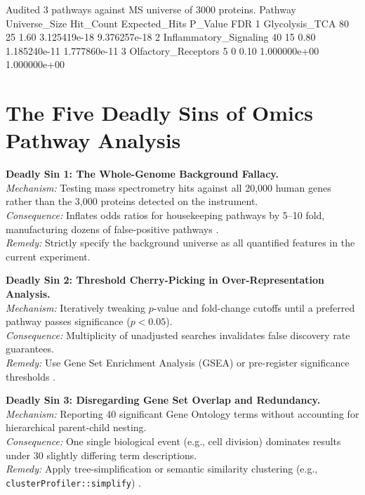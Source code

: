 \documentclass[11pt,oneside]{book}
\begin{document}
\begin{routput}
Audited 3 pathways against MS universe of 3000 proteins.
                 Pathway Universe\_Size Hit\_Count Expected\_Hits      P\_Value          FDR
1         Glycolysis\_TCA            80        25          1.60 3.125419e-18 9.376257e-18
2 Inflammatory\_Signaling            40        15          0.80 1.185240e-11 1.777860e-11
3    Olfactory\_Receptors             5         0          0.10 1.000000e+00 1.000000e+00
\end{routput}

\section{The Five Deadly Sins of Omics Pathway Analysis}

\begin{pitfallbox}
\textbf{Deadly Sin 1: The Whole-Genome Background Fallacy.}\\
\textit{Mechanism:} Testing mass spectrometry hits against all 20,000 human genes rather than the 3,000 proteins detected on the instrument.\\
\textit{Consequence:} Inflates odds ratios for housekeeping pathways by 5--10 fold, manufacturing dozens of false-positive pathways \cite{young2010gene, yu2012clusterprofiler}.\\
\textit{Remedy:} Strictly specify the background universe as all quantified features in the current experiment.
\end{pitfallbox}

\begin{pitfallbox}
\textbf{Deadly Sin 2: Threshold Cherry-Picking in Over-Representation Analysis.}\\
\textit{Mechanism:} Iteratively tweaking $p$-value and fold-change cutoffs until a preferred pathway passes significance ($p < 0.05$).\\
\textit{Consequence:} Multiplicity of unadjusted searches invalidates false discovery rate guarantees.\\
\textit{Remedy:} Use Gene Set Enrichment Analysis (GSEA) or pre-register significance thresholds \cite{subramanian2005gene, khatri2012ten}.
\end{pitfallbox}

\begin{pitfallbox}
\textbf{Deadly Sin 3: Disregarding Gene Set Overlap and Redundancy.}\\
\textit{Mechanism:} Reporting 40 significant Gene Ontology terms without accounting for hierarchical parent-child nesting.\\
\textit{Consequence:} One single biological event (e.g., cell division) dominates results under 30 slightly differing term descriptions.\\
\textit{Remedy:} Apply tree-simplification or semantic similarity clustering (e.g., \texttt{clusterProfiler::simplify}) \cite{yu2012clusterprofiler}.
\end{pitfallbox}
\end{document}
